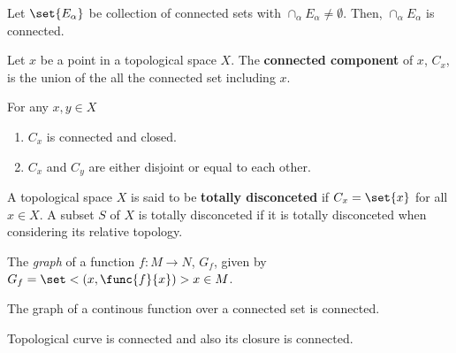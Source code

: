 \begin{proposition}
    Let \(\set{E_{\alpha}}\) be collection of connected sets with \(\cap_{\alpha} E_{\alpha} \neq \emptyset\). Then, \(\cap_{\alpha} E_{\alpha}\) is connected.
\end{proposition}

\begin{definition}
    Let \(x\) be a point in a topological space \(X\). The \textbf{connected component} of \(x\), \(C_x\), is the union of the all the connected set including \(x\).
\end{definition}

\begin{proposition}
    For any \(x,y \in X\)
    \begin{enumerate}
        \item \(C_x\) is connected and closed.
        \item \(C_x\) and \(C_y\) are either disjoint or equal to each other.
    \end{enumerate}
\end{proposition}

\begin{definition}
    A topological space \(X\) is said to be \textbf{totally disconceted} if \(C_x = \set{x}\) for all \(x \in X\). A subset \(S\) of \(X\) is totally disconceted if it is totally disconceted when considering its relative topology.
\end{definition}

\begin{definition}
    The \textit{graph} of a function \(f:M \to N\), \(G_f\), given by \(G_f = \set<(x,\func{f}{x})>{ x \in M}\).
\end{definition}

\begin{theorem}
    The graph of a continous function over a connected set is connected.
\end{theorem}
\begin{example}
    Topological curve is connected and also its closure is connected.
\end{example}


